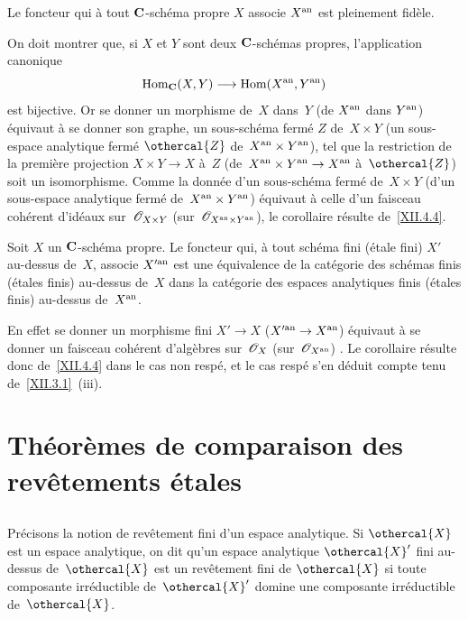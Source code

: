 \begin{corollaire}
\label{XII.4.5}
Le foncteur qui \`a tout $\mathbf{C}$-sch\'ema propre $X$ associe
$X^{\mathrm{an}}$ est pleinement fid\`ele.
\end{corollaire}

On doit montrer que, si $X$ et $Y$ sont deux $\mathbf{C}$-sch\'emas
propres, l'application canonique
$$
\Hom_{\CC}(X,Y)\to\Hom(X^{\an},Y^{\an})
$$
est bijective. Or se donner un morphisme de~$X$ dans~$Y$ (\resp de
$X^{\mathrm{an}}$ dans $Y^{\mathrm{an}}$) \'equivaut \`a se donner son graphe,
\ie un sous-sch\'ema ferm\'e $Z$ de~$X\times Y$ (\resp un
sous-espace analytique ferm\'e $\othercal{Z}$ de~$X^{\mathrm{an}}\times
Y^{\mathrm{an}}$), tel que la restriction de la premi\`ere projection
$X\times Y\to X$ \`a~$Z$ (\resp de~$X^{\an}\times Y^{\an}\to
X^{\an}$ \`a~$\othercal{Z}$) soit
un isomorphisme. Comme la donn\'ee d'un sous-sch\'ema ferm\'e
de~$X\times Y$ (\resp d'un sous-espace analytique ferm\'e
de~$X^{\mathrm{an}}\times Y^{\mathrm{an}}$) \'equivaut \`a celle d'un faisceau
coh\'erent d'id\'eaux sur~$\cal{O}_{X\times Y}$ (\resp sur~$\cal{O}_{X^{\an}\times Y^{\an}}$), le corollaire r\'esulte
de~\ref{XII.4.4}.

\begin{corollaire}
\label{XII.4.6}
Soit $X$ un $\mathbf{C}$-sch\'ema propre. Le foncteur qui, \`a tout
sch\'ema fini (\resp \'etale fini) $X'$ au-dessus de~$X$, associe
$X'^{\mathrm{an}}$ est une \'equivalence de la cat\'egorie des sch\'emas
finis (\resp \'etales finis) au-dessus de~$X$ dans la cat\'egorie
des espaces analytiques finis (\resp \'etales finis) au-dessus
de~$X^{\mathrm{an}}$.
\end{corollaire}

En effet se donner un morphisme fini $X'\to X$ (\resp $X'^{\an}\to
X^{\an}$) \'equivaut \`a se donner un faisceau coh\'erent
d'alg\`ebres sur~$\cal{O}_X$ (\resp sur~$\cal{O}_{X^{\an}}$)
\cite[~\S 5~th.\, 2]{XII.4}. Le corollaire r\'esulte donc de~\ref{XII.4.4}
dans le cas non resp\'e, et le cas resp\'e s'en d\'eduit compte
tenu de~\ref{XII.3.1}~(iii).

\section{Th\'eor\`emes de comparaison des rev\^etements \'etales}
\label{XII.5}
\setcounter{subsection}{-1}
\subsection{}
\label{XII.5.0}
Pr\'ecisons la notion de rev\^etement fini d'un espace analytique.
Si $\othercal{X}$ est un espace analytique, on dit qu'un espace analytique
$\othercal{X}'$ fini au-dessus de~$\othercal{X}$ est un rev\^etement fini de
$\othercal{X}$ si toute composante irr\'eductible de~$\othercal{X}'$ domine
une composante irr\'eductible de~$\othercal{X}$.


